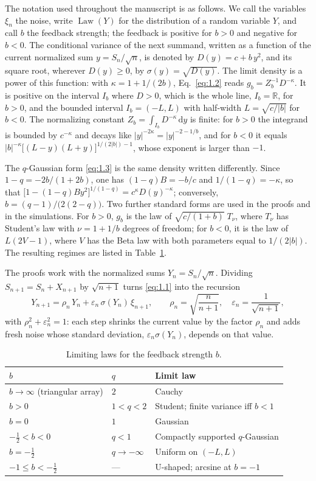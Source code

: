 \documentclass[aip,jmp,preprint,onecolumn,floatfix,superscriptaddress,nofootinbib,11pt]{revtex4-2}
\theoremstyle{plain}
\theoremstyle{remark}
\numberwithin{equation}{section}
\newcommand{\dd}{\mathrm{d}}
\newcommand{\eps}{\varepsilon}
\newcommand{\Law}{\operatorname{Law}}
\begin{document}
The notation used throughout the manuscript is as follows. We call the variables $\xi_n$ the noise, write $\Law(Y)$ for the distribution of a random variable $Y$, and call $b$ the feedback strength; the feedback is positive for $b>0$ and negative for $b<0$. The conditional variance of the next summand, written as a function of the current normalized sum $y=S_n/\sqrt n$, is denoted by $D(y)=c+b\,y^{2}$, and its square root, wherever $D(y)\ge0$, by $\sigma(y)=\sqrt{D(y)}$. The limit density is a power of this function: with $\kappa=1+1/(2b)$, Eq.~\eqref{eq:1.2} reads $g_b=Z_b^{-1}D^{-\kappa}$. It is positive on the interval $I_b$ where $D>0$, which is the whole line, $I_b=\mathbb R$, for $b>0$, and the bounded interval $I_b=(-L,L)$ with half-width $L=\sqrt{c/|b|}$ for $b<0$. The normalizing constant $Z_b=\int_{I_b}D^{-\kappa}\,\dd y$ is finite: for $b>0$ the integrand is bounded by $c^{-\kappa}$ and decays like $|y|^{-2\kappa}=|y|^{-2-1/b}$, and for $b<0$ it equals $|b|^{-\kappa}\big[(L-y)(L+y)\big]^{1/(2|b|)-1}$, whose exponent is larger than $-1$.
 
The $q$-Gaussian form \eqref{eq:1.3} is the same density written differently. Since $1-q=-2b/(1+2b)$, one has $(1-q)B=-b/c$ and $1/(1-q)=-\kappa$, so that $\big[1-(1-q)By^{2}\big]^{1/(1-q)}=c^{\kappa}D(y)^{-\kappa}$; conversely, $b=(q-1)/\big(2(2-q)\big)$. Two further standard forms are used in the proofs and in the simulations. For $b>0$, $g_b$ is the law of $\sqrt{c/(1+b)}\;T_\nu$, where $T_\nu$ has Student's law with $\nu=1+1/b$ degrees of freedom; for $b<0$, it is the law of $L(2V-1)$, where $V$ has the Beta law with both parameters equal to $1/(2|b|)$. The resulting regimes are listed in Table~\ref{tab:regimes}.
 
The proofs work with the normalized sums $Y_n=S_n/\sqrt n$. Dividing $S_{n+1}=S_n+X_{n+1}$ by $\sqrt{n+1}$ turns \eqref{eq:1.1} into the recursion
%
\begin{equation}
Y_{n+1}=\rho_n\,Y_n+\eps_n\,\sigma(Y_n)\,\xi_{n+1},\qquad \rho_n=\sqrt{\frac{n}{n+1}},\quad \eps_n=\frac{1}{\sqrt{n+1}},
\label{eq:1.4}
\end{equation}
%
with $\rho_n^{2}+\eps_n^{2}=1$: each step shrinks the current value by the factor $\rho_n$ and adds fresh noise whose standard deviation, $\eps_n\sigma(Y_n)$, depends on that value.
%
\begin{table}[t]
\caption{Limiting laws for the feedback strength $b$.}
\label{tab:regimes}
\centering\small
\begin{tabular}{lll}
\toprule
$b$ & $q$ & Limit law \\
\midrule
$b\to\infty$ (triangular array) & $2$ & Cauchy \\
$b>0$ & $1<q<2$ & Student; finite variance iff $b<1$ \\
$b=0$ & $1$ & Gaussian \\
$-\tfrac12<b<0$ & $q<1$ & Compactly supported $q$-Gaussian \\
$b=-\tfrac12$ & $q\to-\infty$ & Uniform on $(-L,L)$ \\
$-1\le b<-\tfrac12$ & --- & U-shaped; arcsine at $b=-1$ \\
\bottomrule
\end{tabular}
\end{table}
 
\end{document}

